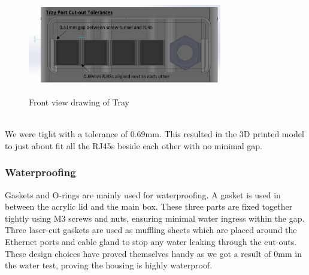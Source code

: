 \documentclass[9pt, technote, a4paper, nofonttune]{IEEEphot}
\begin{document}
        \begin{figure}[h]
        \centering
        \includegraphics[width=20pc]{D5/Tray Port Cutouts.png}
        \label{fig_env1}
        \caption{Front view drawing of Tray}
        \end{figure}
        \\
        We were tight with a tolerance of 0.69mm. This resulted in the 3D printed model to just about fit all the RJ45s beside each other with no minimal gap.
        
        

        \subsubsection{Waterproofing}
        \hspace{0.5cm}Gaskets and O-rings are mainly used for waterproofing. A gasket is used in between the acrylic lid and the main box. These three parts are fixed together tightly using M3 screws and nuts, ensuring minimal water ingress  within the gap. Three laser-cut gaskets are used as muffling sheets which are placed around the Ethernet ports and cable gland to stop any water leaking through the cut-outs. These design choices have proved themselves handy as we got a result of 0mm in the water test, proving the housing is highly waterproof.
\end{document}
